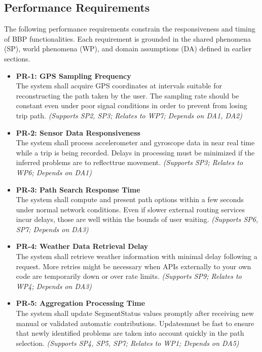 \subsection{Performance Requirements}
\label{sec:performance_requirements}

The following performance requirements constrain the responsiveness and timing of BBP functionalities.
Each requirement is grounded in the shared phenomena (SP), world phenomena (WP), and domain assumptions (DA) defined in earlier sections.

\begin{itemize}

    \item \textbf{PR-1: GPS Sampling Frequency}
    \label{req:PR-1}\\
    The system shall acquire GPS coordinates at intervals suitable for reconstructing the path taken by the user. The sampling rate should be constant even under poor signal conditions in order to prevent from losing trip path.
    \textit{(Supports SP2, SP3; Relates to WP7; Depends on DA1, DA2)}

    \item \textbf{PR-2: Sensor Data Responsiveness}
    \label{req:PR-2}\\
    The system shall process accelerometer and gyroscope data in near real time while a trip is being recorded. Delays in processing must be minimized if the inferred problems are to reflecttrue movement.
    \textit{(Supports SP3; Relates to WP6; Depends on DA1)}

    \item \textbf{PR-3: Path Search Response Time}
    \label{req:PR-3}\\
    The system shall compute and present path options within a few seconds under normal network conditions. Even if slower external routing services incur delays, those are well within the bounds of user waiting.
    \textit{(Supports SP6, SP7; Depends on DA3)}

    \item \textbf{PR-4: Weather Data Retrieval Delay}
    \label{req:PR-4}\\
    The system shall retrieve weather information with minimal delay following a request. More retries might be necessary when APIs externally to your own code are temporarily down or over rate limits.
    \textit{(Supports SP9; Relates to WP4; Depends on DA3)}

    \item \textbf{PR-5: Aggregation Processing Time}
    \label{req:PR-5}\\
    The system shall update SegmentStatus values promptly after receiving new manual or validated automatic contributions. Updatesmust be fast to ensure that newly identified problems are taken into account quickly in the path selection.
    \textit{(Supports SP4, SP5, SP7; Relates to WP1; Depends on DA5)}


\end{itemize}
